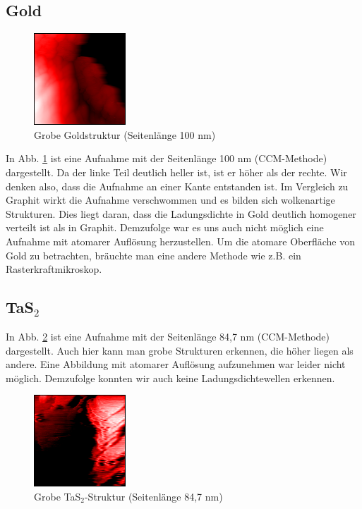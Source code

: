 \subsection{Gold}
\begin{figure}[h]
\centering
\includegraphics[scale=1]{data/gold/raw.png}
\caption{Grobe Goldstruktur (Seitenlänge 100 nm)}
\label{fig:gold}
\end{figure}
In Abb. \ref{fig:gold} ist eine Aufnahme mit der Seitenlänge 100 nm (CCM-Methode) dargestellt.  Da der linke Teil deutlich heller ist, ist er höher als der rechte. Wir denken also, dass die Aufnahme an einer Kante entstanden ist. Im Vergleich zu Graphit wirkt die Aufnahme verschwommen und es bilden sich wolkenartige Strukturen. Dies liegt daran, dass die Ladungsdichte in Gold deutlich homogener verteilt ist als in Graphit. Demzufolge war es uns auch nicht möglich eine Aufnahme mit atomarer Auflösung herzustellen. Um die atomare Oberfläche von Gold zu betrachten, bräuchte man eine andere Methode wie z.B. ein Rasterkraftmikroskop.

\subsection{TaS$_2$}
In Abb. \ref{fig:tas2} ist eine Aufnahme mit der Seitenlänge 84,7 nm (CCM-Methode) dargestellt. Auch hier kann man grobe Strukturen erkennen, die höher liegen als andere. Eine Abbildung mit atomarer Auflösung aufzunehmen war leider nicht möglich. Demzufolge konnten wir auch keine Ladungsdichtewellen erkennen. 

\begin{figure}[h]
\centering
\includegraphics[scale=1]{data/tas2.png}
\caption{Grobe TaS$_2$-Struktur (Seitenlänge 84,7 nm)}
\label{fig:tas2}
\end{figure}
